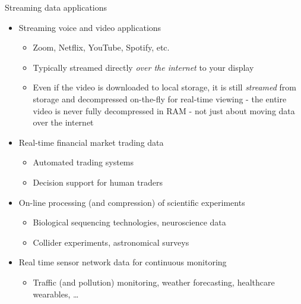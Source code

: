 \begin{frame}{Streaming data applications}
\protect\hypertarget{streaming-data-applications}{}

\begin{itemize}
\tightlist
\item
  Streaming voice and video applications

  \begin{itemize}
  \tightlist
  \item
    Zoom, Netflix, YouTube, Spotify, etc.
  \item
    Typically streamed directly \emph{over the internet} to your display
  \item
    Even if the video is downloaded to local storage, it is still
    \emph{streamed} from storage and decompressed on-the-fly for
    real-time viewing - the entire video is never fully decompressed in
    RAM - not just about moving data over the internet
  \end{itemize}
\item
  Real-time financial market trading data

  \begin{itemize}
  \tightlist
  \item
    Automated trading systems
  \item
    Decision support for human traders
  \end{itemize}
\item
  On-line processing (and compression) of scientific experiments

  \begin{itemize}
  \tightlist
  \item
    Biological sequencing technologies, neuroscience data
  \item
    Collider experiments, astronomical surveys
  \end{itemize}
\item
  Real time sensor network data for continuous monitoring

  \begin{itemize}
  \tightlist
  \item
    Traffic (and pollution) monitoring, weather forecasting, healthcare
    wearables, \ldots{}
  \end{itemize}
\end{itemize}

\end{frame}

